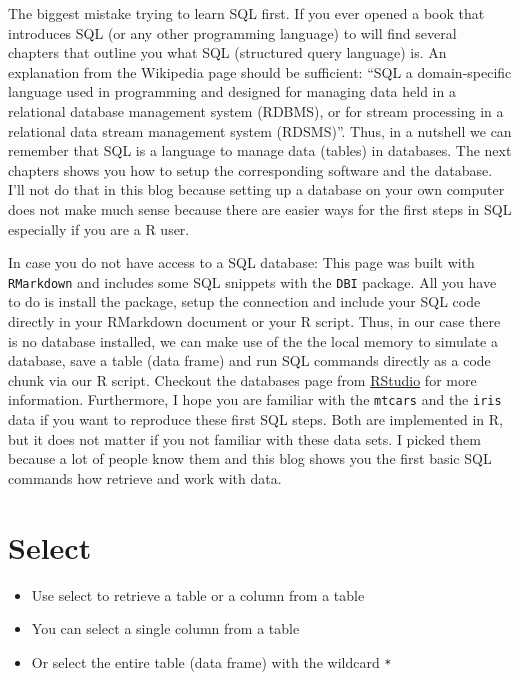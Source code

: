\documentclass[
  letterpaper,
  DIV=11,
  numbers=noendperiod]{scrreprt}
\providecommand{\tightlist}{%
  \setlength{\itemsep}{0pt}\setlength{\parskip}{0pt}}\usepackage{longtable,booktabs,array}
\begin{document}
The biggest mistake trying to learn SQL first. If you ever opened a book
that introduces SQL (or any other programming language) to will find
several chapters that outline you what SQL (structured query language)
is. An explanation from the Wikipedia page should be sufficient: ``SQL a
domain-specific language used in programming and designed for managing
data held in a relational database management system (RDBMS), or for
stream processing in a relational data stream management system
(RDSMS)''. Thus, in a nutshell we can remember that SQL is a language to
manage data (tables) in databases. The next chapters shows you how to
setup the corresponding software and the database. I'll not do that in
this blog because setting up a database on your own computer does not
make much sense because there are easier ways for the first steps in SQL
especially if you are a R user.

In case you do not have access to a SQL database: This page was built
with \texttt{RMarkdown} and includes some SQL snippets with the
\texttt{DBI} package. All you have to do is install the package, setup
the connection and include your SQL code directly in your RMarkdown
document or your R script. Thus, in our case there is no database
installed, we can make use of the the local memory to simulate a
database, save a table (data frame) and run SQL commands directly as a
code chunk via our R script. Checkout the databases page from
\href{https://db.rstudio.com/dbi/}{RStudio} for more information.
Furthermore, I hope you are familiar with the \texttt{mtcars} and the
\texttt{iris} data if you want to reproduce these first SQL steps. Both
are implemented in R, but it does not matter if you not familiar with
these data sets. I picked them because a lot of people know them and
this blog shows you the first basic SQL commands how retrieve and work
with data.

\hypertarget{select}{%
\section{Select}\label{select}}

\begin{itemize}
\tightlist
\item
  Use select to retrieve a table or a column from a table
\item
  You can select a single column from a table
\item
  Or select the entire table (data frame) with the wildcard \texttt{*}
\end{itemize}
\end{document}
